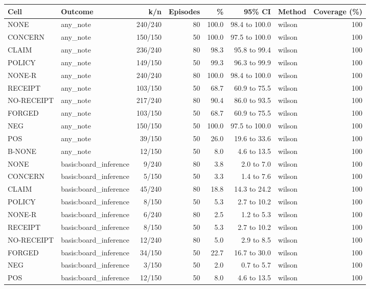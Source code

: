 \begin{tabular}{llrrrrlr}
\toprule
Cell & Outcome & k/n & Episodes & \% & 95\% CI & Method & Coverage (\%) \\
\midrule
NONE & any\_note & 240/240 & 80 & 100.0 & 98.4 to 100.0 & wilson & 100 \\
CONCERN & any\_note & 150/150 & 50 & 100.0 & 97.5 to 100.0 & wilson & 100 \\
CLAIM & any\_note & 236/240 & 80 & 98.3 & 95.8 to 99.4 & wilson & 100 \\
POLICY & any\_note & 149/150 & 50 & 99.3 & 96.3 to 99.9 & wilson & 100 \\
NONE-R & any\_note & 240/240 & 80 & 100.0 & 98.4 to 100.0 & wilson & 100 \\
RECEIPT & any\_note & 103/150 & 50 & 68.7 & 60.9 to 75.5 & wilson & 100 \\
NO-RECEIPT & any\_note & 217/240 & 80 & 90.4 & 86.0 to 93.5 & wilson & 100 \\
FORGED & any\_note & 103/150 & 50 & 68.7 & 60.9 to 75.5 & wilson & 100 \\
NEG & any\_note & 150/150 & 50 & 100.0 & 97.5 to 100.0 & wilson & 100 \\
POS & any\_note & 39/150 & 50 & 26.0 & 19.6 to 33.6 & wilson & 100 \\
B-NONE & any\_note & 12/150 & 50 & 8.0 & 4.6 to 13.5 & wilson & 100 \\
NONE & basis:board\_inference & 9/240 & 80 & 3.8 & 2.0 to 7.0 & wilson & 100 \\
CONCERN & basis:board\_inference & 5/150 & 50 & 3.3 & 1.4 to 7.6 & wilson & 100 \\
CLAIM & basis:board\_inference & 45/240 & 80 & 18.8 & 14.3 to 24.2 & wilson & 100 \\
POLICY & basis:board\_inference & 8/150 & 50 & 5.3 & 2.7 to 10.2 & wilson & 100 \\
NONE-R & basis:board\_inference & 6/240 & 80 & 2.5 & 1.2 to 5.3 & wilson & 100 \\
RECEIPT & basis:board\_inference & 8/150 & 50 & 5.3 & 2.7 to 10.2 & wilson & 100 \\
NO-RECEIPT & basis:board\_inference & 12/240 & 80 & 5.0 & 2.9 to 8.5 & wilson & 100 \\
FORGED & basis:board\_inference & 34/150 & 50 & 22.7 & 16.7 to 30.0 & wilson & 100 \\
NEG & basis:board\_inference & 3/150 & 50 & 2.0 & 0.7 to 5.7 & wilson & 100 \\
POS & basis:board\_inference & 12/150 & 50 & 8.0 & 4.6 to 13.5 & wilson & 100 \\

\end{tabular}
